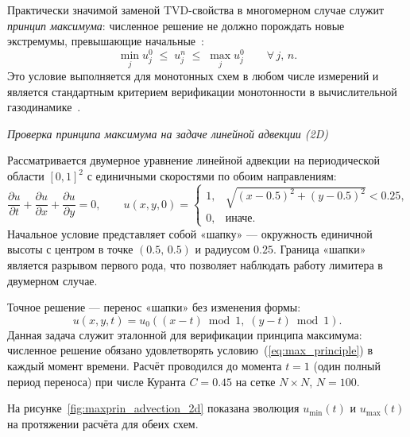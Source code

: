 \documentclass[a4paper,14pt]{extarticle}
\theoremstyle{theorem}
\theoremstyle{lemma}
\begin{document}
Практически значимой заменой TVD-свойства в многомерном случае служит
\textit{принцип максимума}: численное решение не должно порождать новые
экстремумы, превышающие начальные~\cite{leveque1992}:
\begin{equation}
    \label{eq:max_principle}
    \min_j u_j^0 \;\leq\; u_j^n \;\leq\; \max_j u_j^0
    \qquad \forall\, j,\, n.
\end{equation}
Это условие выполняется для монотонных схем в любом числе измерений
и является стандартным критерием верификации монотонности в вычислительной
газодинамике~\cite{leveque1992}.

\textit{Проверка принципа максимума на задаче линейной адвекции (2D)}

Рассматривается двумерное уравнение линейной адвекции на периодической
области $[0,1]^2$ с единичными скоростями по обоим направлениям:
\begin{equation}
    \label{eq:advection_2d}
    \frac{\partial u}{\partial t}
    + \frac{\partial u}{\partial x}
    + \frac{\partial u}{\partial y} = 0,
    \qquad
    u(x, y, 0) =
    \begin{cases}
        1, & \sqrt{(x-0.5)^2 + (y-0.5)^2} < 0.25, \\
        0, & \text{иначе.}
    \end{cases}
\end{equation}
Начальное условие представляет собой «шапку» --- окружность единичной высоты
с центром в точке $(0.5,\,0.5)$ и радиусом $0.25$. Граница «шапки»
является разрывом первого рода, что позволяет наблюдать работу лимитера
в двумерном случае.

Точное решение --- перенос «шапки» без изменения формы:
\begin{equation}
    \label{eq:advection_2d_exact}
    u(x, y, t) = u_0\!\left((x - t)\bmod 1,\; (y - t)\bmod 1\right).
\end{equation}
Данная задача служит эталонной для верификации принципа максимума:
численное решение обязано удовлетворять условию~(\ref{eq:max_principle})
в каждый момент времени. Расчёт проводился до момента $t = 1$
(один полный период переноса) при числе Куранта $C = 0.45$ на
сетке $N \times N$, $N = 100$.

На рисунке~\ref{fig:maxprin_advection_2d} показана эволюция $u_{\min}(t)$
и $u_{\max}(t)$ на протяжении расчёта для обеих схем.
\end{document}
